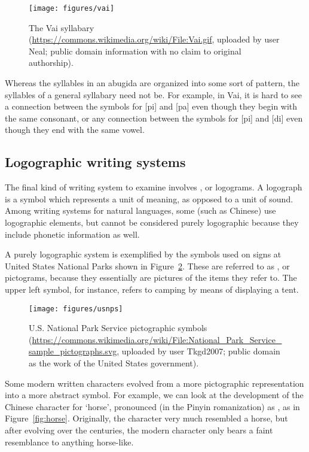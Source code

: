 \begin{figure}[H]
  \texttt{[image: figures/vai]}
  \caption{The Vai syllabary (\url{https://commons.wikimedia.org/wiki/File:Vai.gif}, uploaded by user Neal; public domain information with no claim to original authorship).}
\label{fig:vai}
\end{figure}

Whereas the syllables in an abugida are organized into some sort of pattern, the syllables of a general syllabary need not be.  For example, in Vai, 
it is hard to see a connection between the symbols for {[pi]}
and {[pa]} even though they begin with the same consonant, or any connection between the symbols
for {[pi]} and {[di]} even though they end with the same vowel.

\subsection{Logographic writing systems}
\label{sec:logographic-writing-systems}

The final kind of writing system to examine involves
, or logograms.  A logograph is a symbol which
represents a unit of meaning, as opposed to a unit of sound.  Among writing systems for natural languages, some (such as Chinese) use logographic elements, but cannot be considered purely logographic because they include phonetic information as well.
  

A purely logographic system is exemplified by the symbols used on
signs at United States National Parks shown in Figure~\ref{fig:usnps}.  These
are referred to as , or
pictograms, because they essentially are pictures of the items they
refer to.  The upper left symbol, for instance, refers to camping by
means of displaying a tent.

\begin{figure}
    \texttt{[image: figures/usnps]}
    \caption{U.S. National Park Service pictographic symbols (\url{https://commons.wikimedia.org/wiki/File:National_Park_Service_sample_pictographs.svg}, uploaded by user Tkgd2007; public domain as the work of the United States government).}
    \label{fig:usnps}
\end{figure}

Some modern written characters evolved from a more pictographic representation
into a more abstract symbol.  For example, we can look at the development of the Chinese character for
`horse', pronounced (in the Pinyin romanization) as , as in Figure~\ref{fig:horse}. 
Originally, the character very much resembled a horse, but after
evolving over the centuries, the modern character only bears a
faint resemblance to anything horse-like.

